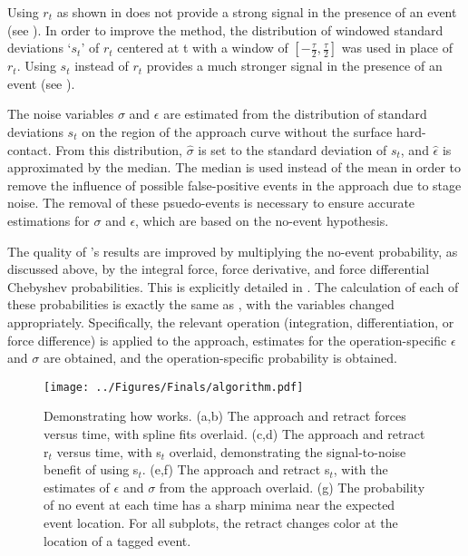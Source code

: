 Using $r_t$ as shown in  does not provide a strong signal in the presence of an event (see ). In order to improve the method, the distribution of windowed standard deviations `$s_t$' of $r_t$ centered at t with a window of $[-\frac{\tau}{2},\frac{\tau}{2}]$ was used in place of $r_t$. Using $s_t$ instead of $r_t$ provides a much stronger signal in the presence of an event (see ).  \pl

The noise variables $\sigma$ and $\epsilon$ are estimated from the distribution of standard deviations $s_t$ on the region of the approach curve without the surface hard-contact. From this distribution, $\hat{\sigma}$ is set to the standard deviation of $s_t$, and $\hat{\epsilon}$ is approximated by the median. The median is used instead of the mean in order to remove the influence of possible false-positive events in the approach due to stage noise. The removal of these psuedo-events is necessary to ensure accurate estimations for $\sigma$ and $\epsilon$, which are based on the no-event hypothesis. \pl

The quality of \name{}'s results are improved by multiplying the no-event probability, as discussed above, by the integral force, force derivative, and force differential Chebyshev probabilities. This is explicitly detailed in . The calculation of each of these probabilities is exactly the same as , with the variables changed appropriately. Specifically, the relevant operation (integration, differentiation, or force difference) is applied to the approach, estimates for the operation-specific $\epsilon$ and $\sigma$ are obtained, and the operation-specific probability is obtained.


\begin{figure}
\centering
\texttt{[image: ../Figures/Finals/algorithm.pdf]}%
\caption[\name{} algorithmic pipeline]{\noindent{}\pStartF Demonstrating how \name{} works. (a,b) The approach and retract forces versus time, with spline fits overlaid. (c,d) The approach and retract r$_t$ versus time, with s$_t$ overlaid, demonstrating the signal-to-noise benefit of using s$_t$. (e,f) The approach and retract s$_t$, with the estimates of $\epsilon$ and $\sigma$ from the approach overlaid. (g) The probability of no event at each time has a sharp minima near the expected event location. For all subplots, the retract changes color at the location of a tagged event. \pEndF }
\end{figure}

